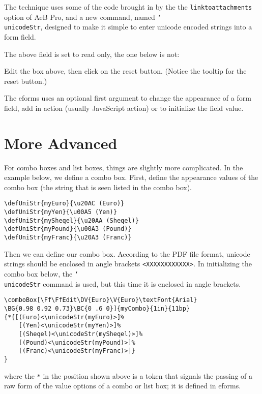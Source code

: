 \documentclass{article}
\newcommand{\cs}[1]{\texttt{\char`\\#1}}
\begin{document}
The technique uses some of the code brought in by the the
\texttt{linktoattachments} option of AeB Pro, and a new command,
named \cs{unicodeStr}, designed to make it simple to enter unicode
encoded strings into a form field.

The above field is set to read only, the one below is not:


Edit the box above, then click on the reset button. (Notice the
tooltip for the reset button.)

The eforms uses an optional first argument to change the appearance
of a form field, add in action (usually JavaScript action) or to
initialize the field value.


\section{More Advanced}

For combo boxes and list boxes, things are slightly more
complicated. In the example below, we define a combo box. First,
define the appearance values of the combo box (the string that is
seen listed in the combo box).
\begin{verbatim}
\defUniStr{myEuro}{\u20AC (Euro)}
\defUniStr{myYen}{\u00A5 (Yen)}
\defUniStr{mySheqel}{\u20AA (Sheqel)}
\defUniStr{myPound}{\u00A3 (Pound)}
\defUniStr{myFranc}{\u20A3 (Franc)}
\end{verbatim}


Then we can define our combo box.  According to the PDF file format,
unicode strings should be enclosed in angle brackets
\verb!<XXXXXXXXXXXX>!. In initializing the combo box below, the
\cs{unicodeStr} command is used, but this time it is enclosed in
angle brackets.
\begin{verbatim}
\comboBox[\Ff\FfEdit\DV{Euro}\V{Euro}\textFont{Arial}
\BG{0.98 0.92 0.73}\BC{0 .6 0}]{myCombo}{1in}{11bp}
{*{[(Euro)<\unicodeStr(myEuro)>]%
    [(Yen)<\unicodeStr(myYen)>]%
    [(Sheqel)<\unicodeStr(mySheqel)>]%
    [(Pound)<\unicodeStr(myPound)>]%
    [(Franc)<\unicodeStr(myFranc)>]}
}
\end{verbatim}
where the \texttt{*} in the position shown above is a token that signals the
passing of a raw form of the value options of a combo or list box; it is
defined in \textsf{eforms}.
\end{document}
